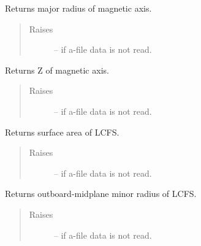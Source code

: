 \documentclass[letterpaper,10pt,english]{sphinxmanual}
\begin{document}
\begin{fulllineitems}
\begin{fulllineitems}
\label{eqtools:eqtools.eqdskreader.EqdskReader.getMagR}
Returns major radius of magnetic axis.
\begin{quote}\begin{description}
\item[{Raises }] \leavevmode
{} -- 
if a-file data is not read.

\end{description}\end{quote}

\end{fulllineitems}


\begin{fulllineitems}
\label{eqtools:eqtools.eqdskreader.EqdskReader.getMagZ}
Returns Z of magnetic axis.
\begin{quote}\begin{description}
\item[{Raises }] \leavevmode
{} -- 
if a-file data is not read.

\end{description}\end{quote}

\end{fulllineitems}


\begin{fulllineitems}
\label{eqtools:eqtools.eqdskreader.EqdskReader.getAreaLCFS}
Returns surface area of LCFS.
\begin{quote}\begin{description}
\item[{Raises }] \leavevmode
{} -- 
if a-file data is not read.

\end{description}\end{quote}

\end{fulllineitems}


\begin{fulllineitems}
\label{eqtools:eqtools.eqdskreader.EqdskReader.getAOut}
Returns outboard-midplane minor radius of LCFS.
\begin{quote}\begin{description}
\item[{Raises }] \leavevmode
{} -- 
if a-file data is not read.


\end{description}
\end{quote}
\end{fulllineitems}
\end{fulllineitems}
\end{document}
